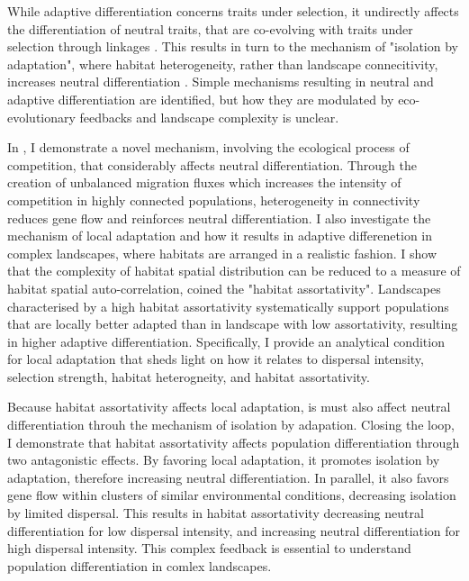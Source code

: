 % 
While adaptive differentiation concerns traits under selection, it undirectly affects the differentiation of neutral traits, that are co-evolving with traits under selection through linkages \xxx. This results in turn to the mechanism of "isolation by adaptation", where habitat heterogeneity, rather than landscape connecitivity, increases neutral differentiation \citep{nosil2008}. 
% 
Simple mechanisms resulting in neutral and adaptive differentiation are identified, but how they are modulated by eco-evolutionary feedbacks and landscape complexity is unclear. %

In \chapi, I demonstrate a novel mechanism, involving the ecological process of competition, that considerably affects neutral differentiation. Through the creation of unbalanced migration fluxes which increases the intensity of competition in highly connected populations, heterogeneity in connectivity reduces gene flow and reinforces neutral differentiation. %
% 
I also investigate the mechanism of local adaptation and how it results in adaptive differenetion in complex landscapes, where habitats are arranged in a realistic fashion. I show that the complexity of habitat spatial distribution can be reduced to a measure of habitat spatial auto-correlation, coined the "habitat assortativity". Landscapes characterised by a high habitat assortativity systematically support populations that are locally better adapted than in landscape with low assortativity, resulting in higher adaptive differentiation. Specifically, I provide an analytical condition for local adaptation that sheds light on how it relates to dispersal intensity, selection strength, habitat heterogneity, and habitat assortativity.

Because habitat assortativity affects local adaptation, is must also affect neutral differentiation throuh the mechanism of isolation by adapation. Closing the loop, I demonstrate that habitat assortativity affects population differentiation through two antagonistic effects. By favoring local adaptation, it promotes isolation by adaptation, therefore increasing neutral differentiation. In parallel, it also favors gene flow within clusters of similar environmental conditions, decreasing isolation by limited dispersal. This results in habitat assortativity decreasing neutral differentiation for low dispersal intensity, and increasing neutral differentiation for high dispersal intensity.
% 
This complex feedback is essential to understand population differentiation in comlex landscapes.

